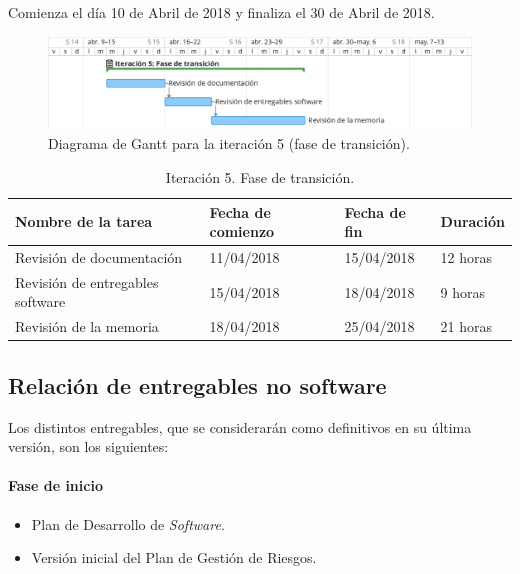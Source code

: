 \documentclass[twoside]{report}
\begin{document}
Comienza el día 10 de Abril de 2018 y finaliza el 30 de Abril de 2018.

\begin{figure}[H]
\begin{center}
\includegraphics[width=\textwidth]{images/gantt/ite5}
\caption{Diagrama de Gantt para la iteración 5 (fase de transición).}
\end{center}
\end{figure}


\begin{table}[H]
\centering
\begin{tabular}{|l|l|l|l|}
\hline
Nombre de la tarea              & Fecha de comienzo & Fecha de fin & Duración \\ \hline
Revisión de documentación       & 11/04/2018        & 15/04/2018   & 12 horas   \\ \hline
Revisión de entregables software & 15/04/2018        & 18/04/2018   & 9 horas   \\ \hline
Revisión de la memoria & 18/04/2018        & 25/04/2018   & 21 horas   \\ \hline
\end{tabular}
\caption{Iteración 5. Fase de transición.}
\end{table}

\subsection{Relación de entregables no software}

Los distintos entregables, que se considerarán como definitivos en su última versión, son los siguientes:

\paragraph{Fase de inicio\\}
\begin{itemize}
\item Plan de Desarrollo de \textit{Software}.
\item Versión inicial del Plan de Gestión de Riesgos.
\end{itemize}
\end{document}
